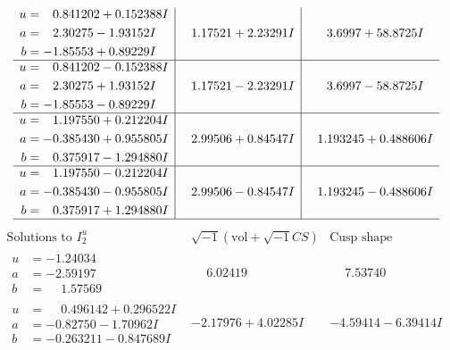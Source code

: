 \documentclass[1p]{elsarticle_modified}
\theoremstyle{definition}
\newcommand{\I}{\sqrt{-1}}
\begin{document}
$$\begin{array}{c|c|c}
\begin{aligned}
u &= \phantom{-}0.841202 + 0.152388 I \\
a &= \phantom{-}2.30275 - 1.93152 I \\
b &= -1.85553 + 0.89229 I\end{aligned}
 & \phantom{-}1.17521 + 2.23291 I & \phantom{-}3.6997 + 58.8725 I \\ \hline\begin{aligned}
u &= \phantom{-}0.841202 - 0.152388 I \\
a &= \phantom{-}2.30275 + 1.93152 I \\
b &= -1.85553 - 0.89229 I\end{aligned}
 & \phantom{-}1.17521 - 2.23291 I & \phantom{-}3.6997 - 58.8725 I \\ \hline\begin{aligned}
u &= \phantom{-}1.197550 + 0.212204 I \\
a &= -0.385430 + 0.955805 I \\
b &= \phantom{-}0.375917 - 1.294880 I\end{aligned}
 & \phantom{-}2.99506 + 0.84547 I & \phantom{-}1.193245 + 0.488606 I \\ \hline\begin{aligned}
u &= \phantom{-}1.197550 - 0.212204 I \\
a &= -0.385430 - 0.955805 I \\
b &= \phantom{-}0.375917 + 1.294880 I\end{aligned}
 & \phantom{-}2.99506 - 0.84547 I & \phantom{-}1.193245 - 0.488606 I\\
 \hline 
 \end{array}$$\newpage$$\begin{array}{c|c|c}  
\text{Solutions to }I^u_{2}& \I (\text{vol} + \sqrt{-1}CS) & \text{Cusp shape}\\
 \hline 
\begin{aligned}
u &= -1.24034\phantom{ +0.000000I} \\
a &= -2.59197\phantom{ +0.000000I} \\
b &= \phantom{-}1.57569\phantom{ +0.000000I}\end{aligned}
 & \phantom{-}6.02419\phantom{ +0.000000I} & \phantom{-}7.53740\phantom{ +0.000000I} \\ \hline\begin{aligned}
u &= \phantom{-}0.496142 + 0.296522 I \\
a &= -0.82750 - 1.70962 I \\
b &= -0.263211 - 0.847689 I\end{aligned}
 & -2.17976 + 4.02285 I & -4.59414 - 6.39414 I \\ \hline\begin{aligned}

\end{aligned}
\end{array}$$
\end{document}
